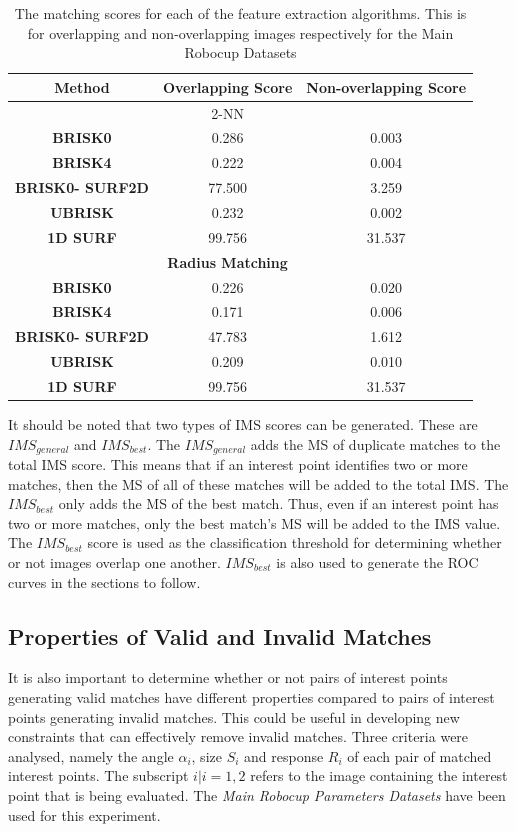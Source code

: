 \documentclass[11pt]{report}
\begin{document}
\begin{table}
\caption{The matching scores for each of the feature extraction algorithms. This is for overlapping and non-overlapping images respectively for the Main Robocup Datasets}
\begin{tabular}{|c|c|c|}
\hline 
\textbf{Method} & \textbf{Overlapping Score} & \textbf{Non-overlapping Score}\tabularnewline
\hline 
\hline 
 & 2-NN & \tabularnewline
\hline 
\textbf{BRISK0} & 0.286 & 0.003\tabularnewline
\hline 
\textbf{BRISK4} & 0.222 & 0.004\tabularnewline
\hline 
\textbf{BRISK0- SURF2D} & 77.500 & 3.259\tabularnewline
\hline 
\textbf{UBRISK} & 0.232 & 0.002\tabularnewline
\hline 
\textbf{1D SURF} & 99.756 & 31.537\tabularnewline
\hline 
 & \textbf{Radius Matching} & \tabularnewline
\hline 
\textbf{BRISK0} & 0.226 & 0.020\tabularnewline
\hline 
\textbf{BRISK4} & 0.171 & 0.006\tabularnewline
\hline 
\textbf{BRISK0- SURF2D} & 47.783 & 1.612\tabularnewline
\hline 
\textbf{UBRISK} & 0.209 & 0.010\tabularnewline
\hline 
\textbf{1D SURF} & 99.756 & 31.537\tabularnewline
\hline 
\end{tabular}
\label{tab:matchingScoreCompare}
\end{table}

It should be noted that two types of IMS scores can be generated. These are $IMS_{general}$ and $IMS_{best}$. The $IMS_{general}$ adds the MS of duplicate matches to the total IMS score. This means that if an interest point identifies two or more matches, then the MS of all of these matches will be added to the total IMS. The $IMS_{best}$ only adds the MS of the best match. Thus, even if an interest point has two or more matches, only the best match's MS will be added to the IMS value. The $IMS_{best}$ score is used as the classification threshold for determining whether or not images overlap one another. $IMS_{best}$ is also used to generate the ROC curves in the sections to follow. \\



\subsection{Properties of Valid and Invalid Matches}
\label{sec:keypointMatching}
It is also important to determine whether or not pairs of interest points generating valid matches have different properties compared to pairs of interest points generating invalid matches. This could be useful in developing new constraints that can effectively remove invalid matches. Three criteria were analysed, namely the angle $\alpha_i$, size $S_i$ and response $R_i$ of each pair of matched interest points. The subscript $i|i={1,2}$ refers to the image containing the interest point that is being evaluated. The \textit{Main Robocup Parameters Datasets} have been used for this experiment.\\
\end{document}

